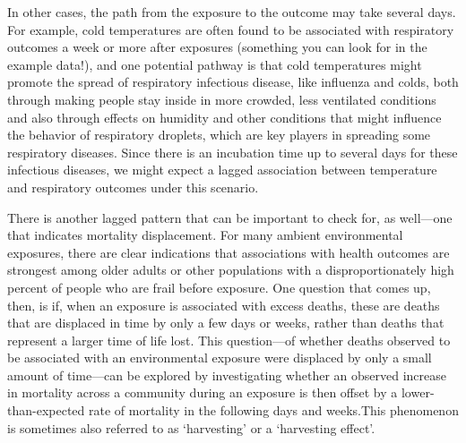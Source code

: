 \documentclass[
]{book}
\begin{document}
In other cases, the path from the exposure to the outcome may take several days.
For example, cold temperatures are often found to be associated with respiratory
outcomes a week or more after exposures (something you can look for in the
example data!), and one potential pathway is that cold temperatures might
promote the spread of respiratory infectious disease, like influenza and colds,
both through making people stay inside in more crowded, less ventilated
conditions and also through effects on humidity and other conditions that might
influence the behavior of respiratory droplets, which are key players in
spreading some respiratory diseases. Since there is an incubation time up to
several days for these infectious diseases, we might expect a lagged association
between temperature and respiratory outcomes under this scenario.

There is another lagged pattern that can be important to check for, as well---one
that indicates mortality displacement. For many ambient environmental exposures,
there are clear indications that associations with health outcomes are strongest
among older adults or other populations with a disproportionately high percent
of people who are frail before exposure. One question that comes up, then, is
if, when an exposure is associated with excess deaths, these are deaths that are
displaced in time by only a few days or weeks, rather than deaths that represent
a larger time of life lost. This question---of whether deaths observed to be
associated with an environmental exposure were displaced by only a small amount of
time---can be explored by investigating whether an observed increase in mortality
across a community during an exposure is then offset by a lower-than-expected
rate of mortality in the following days and weeks.This phenomenon is sometimes
also referred to as `harvesting' or a `harvesting effect'.
\end{document}
